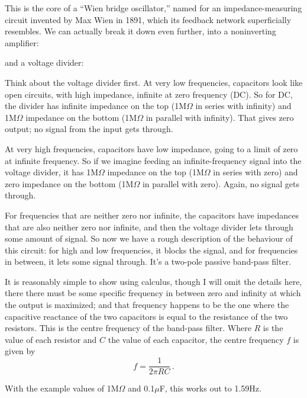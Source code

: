 This is the core of a ``Wien bridge oscillator,'' named for an
impedance-measuring circuit invented by Max Wien in 1891, which its feedback
network superficially resembles.  We can actually break it down even
further, into a noninverting amplifier:

{\centering\par}

and a voltage divider:

{\centering\par}

Think about the voltage divider first.  At very low frequencies, capacitors
look like open circuits, with high impedance, infinite at zero frequency
(DC).  So for DC, the divider has infinite impedance on the top
(1M$\Omega$ in series with infinity) and 1M$\Omega$ impedance on the bottom
(1M$\Omega$ in parallel with infinity).  That gives zero output; no signal
from the input gets through.

At very high frequencies, capacitors have low impedance, going to a limit of
zero at infinite frequency.  So if we imagine feeding an infinite-frequency
signal into the voltage divider, it has 1M$\Omega$ impedance on the top
(1M$\Omega$ in series with zero) and zero impedance on the bottom
(1M$\Omega$ in parallel with zero).  Again, no signal gets through.

For frequencies that are neither zero nor infinite, the capacitors have
impedances that are also neither zero nor infinite, and then the voltage
divider lets through some amount of signal.  So now we have a rough
description of the behaviour of this circuit:  for high and low frequencies,
it blocks the signal, and for frequencies in between, it lets some signal
through.  It's a two-pole passive band-pass filter.

It is reasonably simple to show using calculus, though I will omit the
details here, there there must be some specific frequency in between zero
and infinity at which the output is maximized; and that frequency happens to
be the one where the capacitive reactance of the two capacitors is equal to
the resistance of the two resistors.  This is the centre frequency of the
band-pass filter.  Where $R$ is the value of each resistor and $C$ the value
of each capacitor, the centre frequency $f$ is given by
\begin{equation*}
  f = \frac{1}{2\pi RC} \, .
\end{equation*}

With the example values of 1M$\Omega$ and 0.1$\mu$F, this works out to
1.59Hz.

